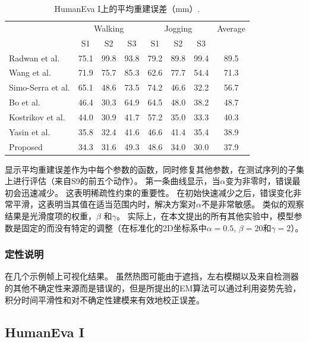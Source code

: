 \begin{table}
\caption{HumanEva I上的平均重建误差（mm）\cite{sigal2010humaneva}.}
\centering
\renewcommand{\arraystretch}{0.5}
\renewcommand{\tabcolsep}{0.1 mm}
\begin{tabular}{l*{3}{c}*{4}{c}}
\toprule
& \multicolumn{3}{c}{Walking} & \multicolumn{3}{c}{Jogging} & Average \\
& S1 & S2 & S3 & S1 & S2 & S3 \\
\toprule
Radwan et al. \cite{radwan2013monocular} & 75.1 & 99.8 & 93.8 & 79.2 & 89.8 & 99.4 & 89.5 \\
Wang et al. \cite{wang2014robust} & 71.9 & 75.7 & 85.3 & 62.6 & 77.7 & 54.4 & 71.3 \\
Simo-Serra et al. \cite{simo2013joint} & 65.1 & 48.6 & 73.5 & 74.2 & 46.6 & 32.2 & 56.7\\
Bo et al. \cite{bo2010twin} & 46.4 & {30.3} & 64.9 & 64.5 & 48.0 & 38.2 & 48.7 \\
Kostrikov et al. \cite{kostrikov2014depth} & 44.0 & 30.9 & 41.7 & 57.2 & 35.0 & 33.3 & 40.3 \\
Yasin et al. \cite{yasin2016dual} & 35.8 & 32.4 & {41.6} & {46.6} & 41.4 & 35.4 & 38.9 \\
Proposed & {34.3} & 31.6 & 49.3 & 48.6 & {34.0} & {30.0} & {37.9}\\
\toprule
\end{tabular}
\label{tab:humaneva}
\end{table}

显示平均重建误差作为中每个参数的函数，同时修复其他参数，在测试序列的子集上进行评估（来自S9的前五个动作）。 第一条曲线显示，当$\alpha$变为非零时，错误最初会迅速减少。 这表明稀疏性约束的重要性。 在初始快速减少之后，错误变化非常平滑，这表明当其值在适当范围内时，解决方案对$\alpha$不是非常敏感。 类似的观察结果是光滑度项的权重，$\beta$ 和$\gamma$。
实际上，在本文提出的所有其他实验中，模型参数是固定的而没有特定的调整（在标准化的2D坐标系中$\alpha=0.5$, $\beta=20$和$\gamma=2$）。

\subsubsection{定性说明}

在几个示例帧上可视化结果。 虽然热图可能由于遮挡，左右模糊以及来自检测器的其他不确定性来源而是错误的，但是所提出的EM算法可以通过利用姿势先验，积分时间平滑性和对不确定性建模来有效地校正误差。

\subsection{HumanEva I}


